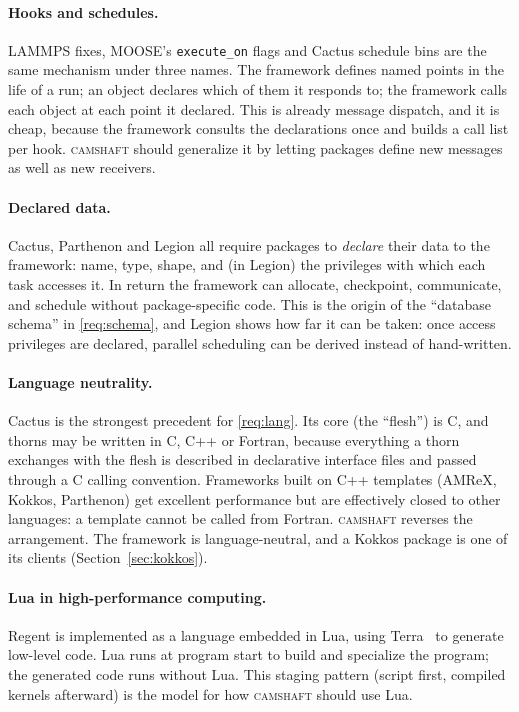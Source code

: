 \documentclass[11pt,a4paper]{article}
\newcommand{\camshaft}{\textsc{camshaft}}
\newcommand{\code}[1]{\texttt{#1}}
\begin{document}
\paragraph{Hooks and schedules.}  LAMMPS fixes, MOOSE's \code{execute\_on}
flags and Cactus schedule bins are the same mechanism under three names.  The
framework defines named points in the life of a run; an object declares which
of them it responds to; the framework calls each object at each point it
declared.  This is already message dispatch, and it is cheap, because the
framework consults the declarations once and builds a call list per hook.
\camshaft{} should generalize it by letting packages define new messages as well
as new receivers.

\paragraph{Declared data.}  Cactus, Parthenon and Legion all require packages
to \emph{declare} their data to the framework: name, type, shape, and (in
Legion) the privileges with which each task accesses it.  In return the
framework can allocate, checkpoint, communicate, and schedule without
package-specific code.  This is the origin of the \enquote{database schema}
in \ref{req:schema}, and Legion shows how far it can be taken: once access
privileges are declared, parallel scheduling can be derived instead of
hand-written.

\paragraph{Language neutrality.}  Cactus is the strongest precedent for
\ref{req:lang}.  Its core (the \enquote{flesh}) is C, and thorns may be
written in C, C++ or Fortran, because everything a thorn exchanges with the
flesh is described in declarative interface files and passed through a C
calling convention.  Frameworks built on C++ templates (AMReX, Kokkos,
Parthenon) get excellent performance but are effectively closed to other
languages: a template cannot be called from Fortran.  \camshaft{} reverses the
arrangement.  The framework is language-neutral, and a Kokkos package is one
of its clients (Section~\ref{sec:kokkos}).

\paragraph{Lua in high-performance computing.}  Regent is implemented as a
language embedded in Lua, using Terra~\cite{terra} to generate low-level code.
Lua runs at program start to build and specialize the program; the generated
code runs without Lua.  This staging pattern (script first, compiled kernels
afterward) is the model for how \camshaft{} should use Lua.
\end{document}
